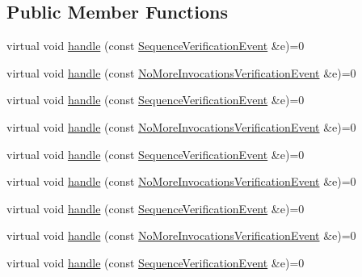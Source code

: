 \subsection*{Public Member Functions}
\begin{DoxyCompactItemize}
\item 
virtual void \mbox{\hyperlink{structfakeit_1_1VerificationEventHandler_adf355a9888bc2bf78ce0e1219bfb1379}{handle}} (const \mbox{\hyperlink{structfakeit_1_1SequenceVerificationEvent}{Sequence\+Verification\+Event}} \&e)=0
\item 
virtual void \mbox{\hyperlink{structfakeit_1_1VerificationEventHandler_a826b9d15e23bad7013b219d8e45ef1d0}{handle}} (const \mbox{\hyperlink{structfakeit_1_1NoMoreInvocationsVerificationEvent}{No\+More\+Invocations\+Verification\+Event}} \&e)=0
\item 
virtual void \mbox{\hyperlink{structfakeit_1_1VerificationEventHandler_adf355a9888bc2bf78ce0e1219bfb1379}{handle}} (const \mbox{\hyperlink{structfakeit_1_1SequenceVerificationEvent}{Sequence\+Verification\+Event}} \&e)=0
\item 
virtual void \mbox{\hyperlink{structfakeit_1_1VerificationEventHandler_a826b9d15e23bad7013b219d8e45ef1d0}{handle}} (const \mbox{\hyperlink{structfakeit_1_1NoMoreInvocationsVerificationEvent}{No\+More\+Invocations\+Verification\+Event}} \&e)=0
\item 
virtual void \mbox{\hyperlink{structfakeit_1_1VerificationEventHandler_adf355a9888bc2bf78ce0e1219bfb1379}{handle}} (const \mbox{\hyperlink{structfakeit_1_1SequenceVerificationEvent}{Sequence\+Verification\+Event}} \&e)=0
\item 
virtual void \mbox{\hyperlink{structfakeit_1_1VerificationEventHandler_a826b9d15e23bad7013b219d8e45ef1d0}{handle}} (const \mbox{\hyperlink{structfakeit_1_1NoMoreInvocationsVerificationEvent}{No\+More\+Invocations\+Verification\+Event}} \&e)=0
\item 
virtual void \mbox{\hyperlink{structfakeit_1_1VerificationEventHandler_adf355a9888bc2bf78ce0e1219bfb1379}{handle}} (const \mbox{\hyperlink{structfakeit_1_1SequenceVerificationEvent}{Sequence\+Verification\+Event}} \&e)=0
\item 
virtual void \mbox{\hyperlink{structfakeit_1_1VerificationEventHandler_a826b9d15e23bad7013b219d8e45ef1d0}{handle}} (const \mbox{\hyperlink{structfakeit_1_1NoMoreInvocationsVerificationEvent}{No\+More\+Invocations\+Verification\+Event}} \&e)=0
\item 
virtual void \mbox{\hyperlink{structfakeit_1_1VerificationEventHandler_adf355a9888bc2bf78ce0e1219bfb1379}{handle}} (const \mbox{\hyperlink{structfakeit_1_1SequenceVerificationEvent}{Sequence\+Verification\+Event}} \&e)=0

\end{DoxyCompactItemize}
